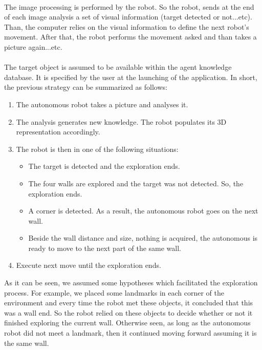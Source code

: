 \documentclass[12pt]{report}
\begin{document}
\paragraph {}
The image processing is performed by the robot. So the robot, sends at the end of each image analysis a set of visual information (target detected or not...etc). Than, the computer relies on the visual information to define the next robot's movement. After that, the robot performs the movement asked and than takes a picture again...etc.

\paragraph {}
The target object is assumed to be available within the agent knowledge database. It is specified by 
the user at the launching of the application.
In short, the previous strategy can be summarized as follows:
	\begin{enumerate}
		\item The autonomous robot takes a picture and analyses it.
		\item The analysis generates new knowledge. The robot populates its 3D representation accordingly. 
		\item The robot is then in one of the following situations:
		\begin{itemize}
			\item The target is detected and the exploration ends.
			\item The four walls are explored and the target was not detected. So, the exploration ends.
			\item A corner is detected. As a result, the autonomous robot goes on the next wall.
			\item Beside the wall distance and size, nothing is acquired, the autonomous is ready to move 
to the next part of the same wall.
		\end{itemize}
		\item Execute next move until the exploration ends.
	\end{enumerate}

	
	As it can be seen, we assumed some hypotheses which facilitated the exploration process. For 
example, we placed some landmarks in each corner of the environment and every time the robot met 
these objects, it concluded that this was a wall end. So the robot relied on these objects to decide whether 
or not it finished exploring the current wall. Otherwise seen, as long as the autonomous robot did not meet a landmark, 
then it continued moving forward assuming it is the same wall.\\
	
\end{document}
